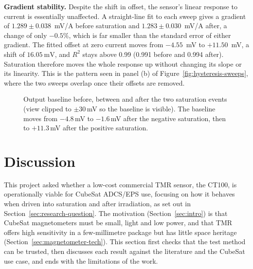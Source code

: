 \documentclass[12pt,a4paper]{article}
\begin{document}
\textbf{Gradient stability.} Despite the shift in offset, the sensor's linear response to current is essentially unaffected. A straight-line fit to each sweep gives a gradient of $1.289 \pm 0.038$~mV/A before saturation and $1.283 \pm 0.030$~mV/A after, a change of only $-0.5\%$, which is far smaller than the standard error of either gradient. The fitted offset at zero current moves from $-4.55$~mV to $+11.50$~mV, a shift of $\SI{16.05}{\milli\volt}$, and $R^2$ stays above 0.99 (0.991 before and 0.994 after). Saturation therefore moves the whole response up without changing its slope or its linearity. This is the pattern seen in panel (b) of Figure~\ref{fig:hysteresis-sweeps}, where the two sweeps overlap once their offsets are removed.

 
\begin{figure}[H]
\centering
{}
\caption{Output baseline before, between and after the two saturation events (view clipped to $\pm30$\,mV so the baseline is visible). The baseline moves from $-4.8$\,mV to $-1.6$\,mV after the negative saturation, then to $+11.3$\,mV after the positive saturation.}
\label{fig:mh-baseline}
\end{figure}
 

 

\section{Discussion}
\label{sec:discussion}

This project asked whether a low-cost commercial TMR sensor, the CT100, is operationally viable for CubeSat ADCS/EPS use, focusing on how it behaves when driven into saturation and after irradiation, as set out in Section~\ref{sec:research-question}. The motivation (Section~\ref{sec:intro}) is that CubeSat magnetometers must be small, light and low power, and that TMR offers high sensitivity in a few-millimetre package but has little space heritage (Section~\ref{sec:magnetometer-tech}). This section first checks that the test method can be trusted, then discusses each result against the literature and the CubeSat use case, and ends with the limitations of the work.
\end{document}
